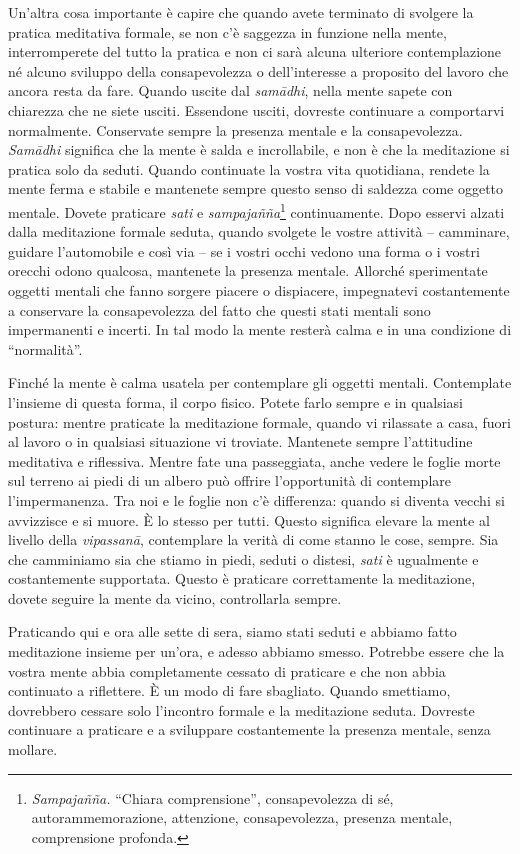 Un'altra cosa importante è capire che quando avete terminato di svolgere
la pratica meditativa formale, se non c'è saggezza in funzione nella
mente, interromperete del tutto la pratica e non ci sarà alcuna
ulteriore contemplazione né alcuno sviluppo della consapevolezza o
dell'interesse a proposito del lavoro che ancora resta da fare. Quando
uscite dal \emph{samādhi}, nella mente sapete con chiarezza che ne siete
usciti. Essendone usciti, dovreste continuare a comportarvi normalmente.
Conservate sempre la presenza mentale e la consapevolezza.
\emph{Samādhi} significa che la mente è salda e incrollabile, e non è
che la meditazione si pratica solo da seduti. Quando continuate la
vostra vita quotidiana, rendete la mente ferma e stabile e mantenete
sempre questo senso di saldezza come oggetto mentale. Dovete praticare
\emph{sati} e \emph{sampajañña}\footnote{\emph{Sampajañña.} ``Chiara
  comprensione'', consapevolezza di sé, autorammemorazione, attenzione,
  consapevolezza, presenza mentale, comprensione profonda.}
continuamente. Dopo esservi alzati dalla meditazione formale seduta,
quando svolgete le vostre attività -- camminare, guidare l'automobile e
così via -- se i vostri occhi vedono una forma o i vostri orecchi odono
qualcosa, mantenete la presenza mentale. Allorché sperimentate oggetti
mentali che fanno sorgere piacere o dispiacere, impegnatevi
costantemente a conservare la consapevolezza del fatto che questi stati
mentali sono impermanenti e incerti. In tal modo la mente resterà calma
e in una condizione di ``normalità''.

Finché la mente è calma usatela per contemplare gli oggetti mentali.
Contemplate l'insieme di questa forma, il corpo fisico. Potete farlo
sempre e in qualsiasi postura: mentre praticate la meditazione formale,
quando vi rilassate a casa, fuori al lavoro o in qualsiasi situazione vi
troviate. Mantenete sempre l'attitudine meditativa e riflessiva. Mentre
fate una passeggiata, anche vedere le foglie morte sul terreno ai piedi
di un albero può offrire l'opportunità di contemplare l'impermanenza.
Tra noi e le foglie non c'è differenza: quando si diventa vecchi si
avvizzisce e si muore. È lo stesso per tutti. Questo significa elevare
la mente al livello della \emph{vipassanā}, contemplare la verità di
come stanno le cose, sempre. Sia che camminiamo sia che stiamo in piedi,
seduti o distesi, \emph{sati} è ugualmente e costantemente supportata.
Questo è praticare correttamente la meditazione, dovete seguire la mente
da vicino, controllarla sempre.

Praticando qui e ora alle sette di sera, siamo stati seduti e abbiamo
fatto meditazione insieme per un'ora, e adesso abbiamo smesso. Potrebbe
essere che la vostra mente abbia completamente cessato di praticare e
che non abbia continuato a riflettere. È un modo di fare sbagliato.
Quando smettiamo, dovrebbero cessare solo l'incontro formale e la
meditazione seduta. Dovreste continuare a praticare e a sviluppare
costantemente la presenza mentale, senza mollare.

